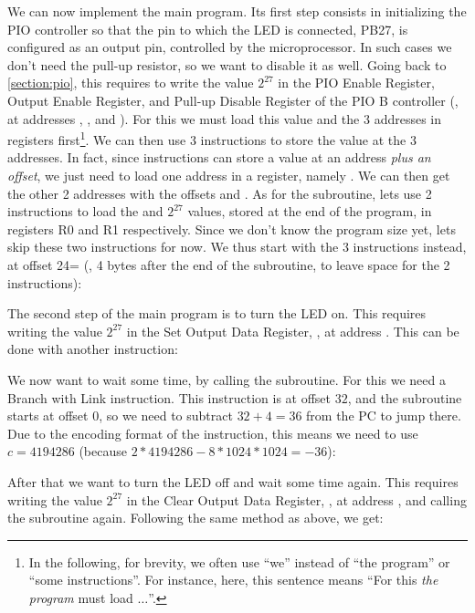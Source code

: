 We can now implement the main program. Its first step consists in initializing
the PIO controller so that the pin to which the LED is connected, PB27, is
configured as an output pin, controlled by the microprocessor. In such cases we
don't need the pull-up resistor, so we want to disable it as well. Going back
to \cref{section:pio}, this requires to write the value $2^{27}$ in the PIO
Enable Register, Output Enable Register, and Pull-up Disable Register of the
PIO B controller (\ie, at addresses , , and
). For this we must load this value and the 3 addresses in
registers first\footnote{In the following, for brevity, we often use ``we''
instead of ``the program'' or ``some instructions''. For instance, here, this
sentence means ``For this {\em the program} must load $\ldots$''.}. We can then
use 3  instructions to store the value at the 3 addresses. In fact,
since  instructions can store a value at an address {\em plus an
offset}, we just need to load one address in a register, namely
. We can then get the other 2 addresses with the offsets
 and . As for the subroutine, lets use 2 
instructions to load the  and $2^{27}$ values, stored at the
end of the program, in registers R0 and R1 respectively. Since we don't know
the program size yet, lets skip these two  instructions for now. We
thus start with the 3  instructions instead, at offset 24=
(\ie, 4 bytes after the end of the subroutine, to leave space for the 2
 instructions):


The second step of the main program is to turn the LED on. This requires
writing the value $2^{27}$ in the Set Output Data Register, \ie, at address
. This can be done with another  instruction:


We now want to wait some time, by calling the subroutine. For this we need a
Branch with Link instruction. This instruction is at offset $32$, and the
subroutine starts at offset $0$, so we need to subtract $32+4=36$ from the PC
to jump there. Due to the encoding format of the  instruction, this
means we need to use $c=4194286$ (because $2*4194286-8*1024*1024=-36$):


After that we want to turn the LED off and wait some time again. This requires
writing the value $2^{27}$ in the Clear Output Data Register, \ie, at address
, and calling the subroutine again. Following the same
method as
above, we get:

